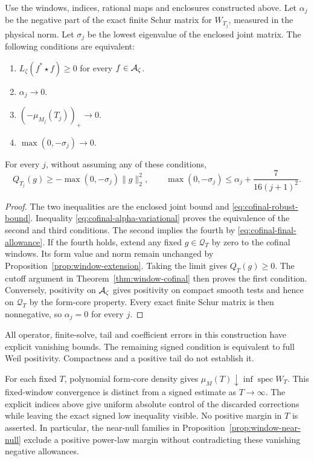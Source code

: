 \begin{theorem}
\label{thm:cofinal-equivalence}
Use the windows, indices, rational maps and enclosures constructed
above.  Let $\alpha_j$ be the negative part of the exact finite
Schur matrix for $W_{T_j}$, measured in the physical norm.
Let $\sigma_j$ be the lowest eigenvalue of the enclosed joint
matrix.  The following conditions are equivalent:
\begin{enumerate}
\item $L_\zeta(f^*\star f)\ge0$ for every $f\in\mathcal A_\zeta$.
\item $\alpha_j\to0$.
\item $(-\mu_{M_j}(T_j))_+\to0$.
\item $\max(0,-\sigma_j)\to0$.
\end{enumerate}
For every $j$, without assuming any of these conditions,
\begin{equation}
 Q_{T_j}(g)\ge-\max(0,-\sigma_j)\|g\|_2^2,
 \qquad
 \max(0,-\sigma_j)\le\alpha_j+\frac7{16(j+1)^2}.
 \label{eq:cofinal-final-allowance}
\end{equation}
\end{theorem}
\begin{proof}
The two inequalities are the enclosed joint bound and
\eqref{eq:cofinal-robust-bound}.  Inequality
\eqref{eq:cofinal-alpha-variational} proves the equivalence
of the second and third conditions.  The second implies the
fourth by \eqref{eq:cofinal-final-allowance}.
If the fourth holds, extend any fixed $g\in\mathcal Q_T$ by
zero to the cofinal windows.  Its form value and norm remain
unchanged by Proposition~\ref{prop:window-extension}.
Taking the limit gives $Q_T(g)\ge0$.  The cutoff argument in
Theorem~\ref{thm:window-cofinal} then proves the first condition.
Conversely, positivity on $\mathcal A_\zeta$ gives positivity on
compact smooth tests and hence on $\mathcal Q_T$ by the form-core
property.  Every exact finite Schur matrix is then nonnegative,
so $\alpha_j=0$ for every $j$.
\end{proof}

All operator, finite-solve, tail and coefficient errors in this
construction have explicit vanishing bounds.  The remaining
signed condition is equivalent to full Weil positivity.
Compactness and a positive tail do not establish it.

For each fixed $T$, polynomial form-core density gives
$\mu_M(T)\downarrow\inf\operatorname{spec}W_T$. This fixed-window
convergence is distinct from a signed estimate as $T\to\infty$.
The explicit indices above give uniform absolute control of the
discarded corrections while leaving the exact signed low
inequality visible. No positive margin in $T$ is asserted.
In particular, the near-null families in Proposition~\ref{prop:window-near-null}
exclude a positive power-law margin without contradicting these
vanishing negative allowances.
